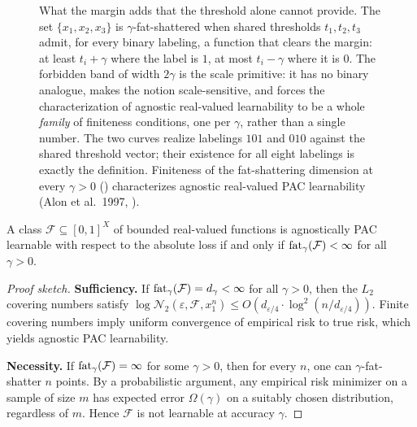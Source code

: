 \begin{figure}[ht]
\caption[$\gamma$-fat-shattering: curves realizing labelings against shared
thresholds]{What the margin adds that the threshold alone cannot provide.
The set $\{x_1, x_2, x_3\}$ is $\gamma$-fat-shattered when shared thresholds
$t_1, t_2, t_3$ admit, for every binary labeling, a function that clears
the margin: at least $t_i + \gamma$ where the label is $1$, at most
$t_i - \gamma$ where it is $0$.  The forbidden band of width $2\gamma$ is the
scale primitive: it has no binary analogue, makes the notion scale-sensitive,
and forces the characterization of agnostic real-valued learnability to be a
whole \emph{family} of finiteness conditions, one per $\gamma$, rather than a
single number.  The two curves realize labelings $101$ and $010$ against the
shared threshold vector; their existence for all eight labelings is exactly the
definition.  Finiteness of the fat-shattering dimension at every $\gamma >0$
() characterizes agnostic real-valued PAC
learnability (Alon et al.\ 1997, ).}
\label{fig:fat-shattering}
\end{figure}

\begin{thm}
\label{thm:real-valued-char}
A class $\mathcal{F} \subseteq [0,1]^X$ of bounded real-valued functions is
agnostically PAC learnable with respect to the absolute loss if and only if
$\mathrm{fat}_\gamma(\mathcal{F}) < \infty$ for all $\gamma > 0$.
\end{thm}

\begin{proof}[Proof sketch]
\textbf{Sufficiency.}  If $\mathrm{fat}_\gamma(\mathcal{F}) = d_\gamma < \infty$
for all $\gamma > 0$, then the $L_2$ covering numbers satisfy
$\log \mathcal{N}_2(\varepsilon, \mathcal{F}, x_1^n) \leq
O(d_{\varepsilon/4} \cdot \log^2(n/d_{\varepsilon/4}))$.
Finite covering numbers imply uniform convergence of empirical risk to
true risk, which yields agnostic PAC learnability.

\textbf{Necessity.}  If $\mathrm{fat}_\gamma(\mathcal{F}) = \infty$ for some
$\gamma > 0$, then for every $n$, one can $\gamma$-fat-shatter $n$ points.
By a probabilistic argument, any empirical risk minimizer on a sample of
size $m$ has expected error $\Omega(\gamma)$ on a suitably chosen
distribution, regardless of $m$.  Hence $\mathcal{F}$ is not learnable
at accuracy $\gamma$.
\end{proof}

